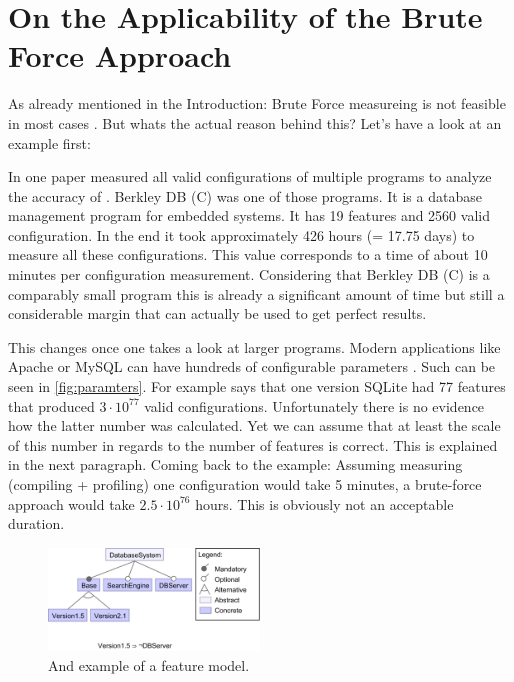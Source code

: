 \section{On the Applicability of the Brute Force Approach}

As already mentioned in the Introduction: Brute Force measureing is not feasible in most cases \cite{AutomatedFeatureDetectionSiegmund2012}. But whats the actual reason behind this?
Let's have a look at an example first:

In one paper \citet{AutomatedFeatureDetectionSiegmund2012} measured all valid configurations of multiple programs to analyze the accuracy of \AFID. Berkley DB (C) was one of those programs. It is a database management program for embedded systems. It has 19 features and 2560 valid configuration. In the end it took approximately 426 hours (= 17.75 days) to measure all these configurations. This value corresponds to a time of about 10 minutes per configuration measurement. Considering that Berkley DB (C) is a comparably small program this is already a significant amount of time but still a considerable margin that can actually be used to get perfect results.

This changes once one takes a look at larger programs. Modern applications like Apache or MySQL can have hundreds of configurable parameters \cite{YouveGivenMeTooManyKnobs}. Such can be seen in \cref{fig:paramters}. For example \citet{VAMOSConference} says that one version SQLite had 77 features that produced $3 \cdot 10^{77}$ valid configurations. Unfortunately there is no evidence how the latter number was calculated. Yet we can assume that at least the scale of this number in regards to the number of features is correct. This is explained in the next paragraph. Coming back to the example: Assuming measuring (compiling + profiling) one configuration would take 5 minutes, a brute-force approach would take $2.5 \cdot 10^76$ hours. This is obviously not an acceptable duration.

\begin{figure}
	\includegraphics[width = 0.5\textwidth]{presentation/figures/FeatureModel}
	\captionsetup{width=0.95\linewidth}
	\caption{And example of a feature model.}
	\label{fig:FeatureModel}
\end{figure}

